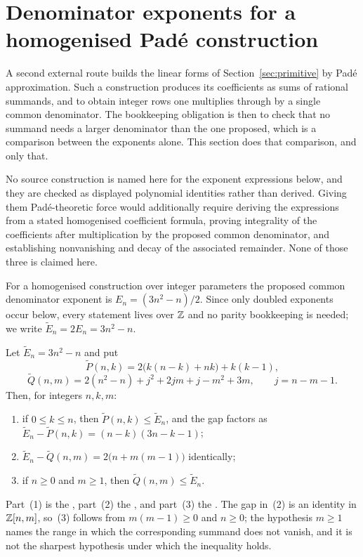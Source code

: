 \documentclass[11pt]{article}
\begin{document}
\section{Denominator exponents for a homogenised Pad\'e
construction}\label{sec:pade}

A second external route builds the linear forms of Section~\ref{sec:primitive}
by Pad\'e approximation.  Such a construction produces its coefficients as sums
of rational summands, and to obtain integer rows one multiplies through by a
single common denominator.  The bookkeeping obligation is then to check that no
summand needs a larger denominator than the one proposed, which is a comparison
between the exponents alone.  This section does that comparison, and only that.

No source construction is named here for the exponent expressions below, and
they are checked as displayed polynomial identities rather than derived.
Giving them Pad\'e-theoretic force would additionally require deriving the
expressions from a stated homogenised coefficient formula, proving integrality
of the coefficients after multiplication by the proposed common denominator,
and establishing nonvanishing and decay of the associated remainder.  None of
those three is claimed here.

For a
homogenised construction over integer parameters the proposed common
denominator exponent is $E_n=(3n^{2}-n)/2$.  Since only doubled exponents
occur below, every statement lives over $\mathbb{Z}$ and no parity bookkeeping is
needed; we write $\widetilde{E}_n=2E_n=3n^{2}-n$.

\begin{proposition}\label{res:pade}
Let $\widetilde{E}_n=3n^{2}-n$ and put
\[
 \widetilde{P}(n,k)=2\bigl(k(n-k)+nk\bigr)+k(k-1),
\]
\[
 \widetilde{Q}(n,m)=2(n^{2}-n)+j^{2}+2jm+j-m^{2}+3m,
 \qquad j=n-m-1 .
\]
Then, for integers $n,k,m$:
\begin{enumerate}
\item if $0\le k\le n$, then $\widetilde{P}(n,k)\le\widetilde{E}_n$, and the
gap factors as
$\widetilde{E}_n-\widetilde{P}(n,k)=(n-k)(3n-k-1)$;
\item $\widetilde{E}_n-\widetilde{Q}(n,m)=2\bigl(n+m(m-1)\bigr)$ identically;
\item if $n\ge0$ and $m\ge1$, then $\widetilde{Q}(n,m)\le\widetilde{E}_n$.
\end{enumerate}
\end{proposition}

\noindent Part~(1) is the
, part~(2) the
, and part~(3) the
.  The gap in~(2) is an identity in $\mathbb{Z}[n,m]$, so~(3) follows
from $m(m-1)\ge0$ and $n\ge0$; the hypothesis $m\ge1$ names the range in which
the corresponding summand does not vanish, and it is not the sharpest
hypothesis under which the inequality holds.
\end{document}
